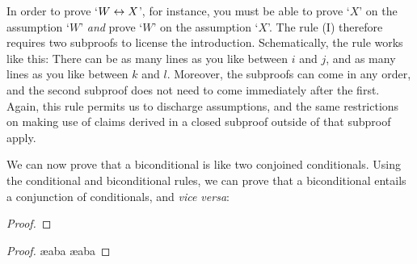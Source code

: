 In order to prove `$W \leftrightarrow X$', for instance, you must be able to prove `$X$' on the assumption `$W$' \emph{and} prove `$W$' on the assumption `$X$'. The  rule ({\eiff}I) therefore requires two subproofs to license the introduction. Schematically, the rule works like this:
There can be as many lines as you like between $i$ and $j$, and as many lines as you like between $k$ and $l$. Moreover, the subproofs can come in any order, and the second subproof does not need to come immediately after the first. Again, this rule permits us to discharge assumptions, and the same restrictions on making use of claims derived in a closed subproof outside of that subproof apply.

We can now prove that a biconditional is like two conjoined conditionals. Using the conditional and biconditional rules, we can prove that a biconditional entails a conjunction of conditionals, and \emph{vice versa}: 

\begin{multicols}{2}\noindent\hspace{-1cm}
	 \begin{proof}
	\open {}
	\open {}
	\close
	\open
	\close
\end{proof}\quad
	\begin{proof}
		\ae{aba}
		\open {}
		\close
		\ae{aba}
		\open {}
		\close
	\end{proof}
\end{multicols}

